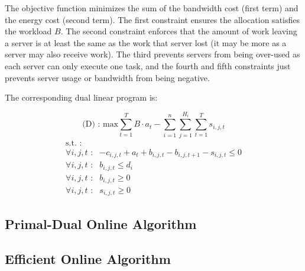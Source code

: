 The objective function minimizes the sum of the bandwidth cost (first term) and the energy cost (second term).
The first constraint ensures the allocation satisfies the workload $B$.
The second constraint enforces that the amount of work leaving a server is at least the same as the work that server lost (it may be more as a server may also receive work).
The third prevents servers from being over-used as each server can only execute one task, and the fourth and fifth constraints just prevents server usage or bandwidth from being negative.

The corresponding dual linear program is:

\[
\textrm{(D) : max}   \sum^{T}_{t=1}B \cdot a_t - \sum^{n}_{i=1}\sum^{H_i}_{j=1}\sum^{T}_{t=1}s_{i,j,t}
\]
\[
	\begin{array}{rc}
	\textrm{s.t. :} & \\
		\forall i,j,t \textrm{ :}	    & -c_{i,j,t} + a_t + b_{i,j,t} - b_{i,j,t+1} - s_{i,j,t} \leq 0 \\
		\forall i,j,t \textrm{ :}	    & b_{i,j,t} \leq d_i \\
		\forall i,j,t \textrm{ :}	    & b_{i,j,t} \geq 0 \\
		\forall i,j,t \textrm{ :}	    & s_{i,j,t} \geq 0
	\end{array}
\]

\subsection{Primal-Dual Online Algorithm}



\subsection{Efficient Online Algorithm}



